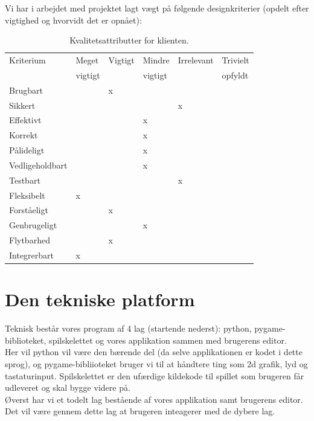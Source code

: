 \documentclass[10pt,a4paper,danish]{article}
\begin{document}
Vi har i arbejdet med projektet lagt vægt på følgende designkriterier (opdelt efter vigtighed og
hvorvidt det er opnået): 
\begin{table}[h!]
  \begin{center}
    \begin{tabular}{llllll}
      \toprule
      Kriterium & Meget   & Vigtigt & Mindre  & Irrelevant & Trivielt \\
                & vigtigt &         & vigtigt &            & opfyldt  \\
      \midrule
      Brugbart        & &x& & & \\
      Sikkert         & & & &x& \\
      Effektivt       & & &x& & \\
      Korrekt         & & &x& & \\
      Pålideligt      & & &x& & \\
      Vedligeholdbart & & &x& & \\
      Testbart        & & & &x& \\
      Fleksibelt      &x& & & & \\
      Forståeligt     & &x& & & \\
      Genbrugeligt    & & &x& & \\
      Flytbarhed      & &x& & & \\
      Integrerbart    &x& & & & \\
      \bottomrule
    \end{tabular}
    \caption{Kvalitetsattributter for klienten.}
    \label{tab:kvalitetsattributter_program}
  \end{center}
\end{table}

\section{Den tekniske platform}
Teknisk består vores program af 4 lag (startende nederst): python, pygame-biblioteket, 
spilskelettet og vores applikation sammen med brugerens editor. \\

Her vil python vil være den bærende del (da selve applikationen er kodet i dette sprog), 
og pygame-bibliioteket bruger vi til at håndtere ting som 2d grafik, lyd og tastaturinput. 
Spilskelettet er den ufærdige kildekode til spillet som brugeren får udleveret og skal bygge
videre på.
\\
Øverst har vi et todelt lag bestående af vores applikation samt brugerens editor.
Det vil være gennem dette lag at brugeren inteagerer med de dybere lag.
\end{document}
